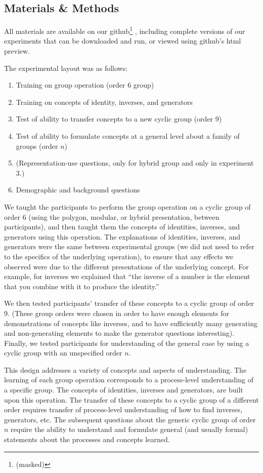 \documentclass[man,10pt]{apa6}
\begin{document}
\subsection{Materials \& Methods} 
All materials are available on our github\footnote{(masked)}%
, including complete versions of our experiments that can be downloaded and run, or viewed using github's html preview. \par
The experimental layout was as follows:
\begin{enumerate}
\item Training on group operation (order 6 group)
\item Training on concepts of identity, inverses, and generators
\item Test of ability to transfer concepts to a new cyclic group (order 9)
\item Test of ability to formulate concepts at a general level about a family of groups (order $n$)
\item (Representation-use questions, only for hybrid group and only in experiment 3.)
\item Demographic and background questions
\end{enumerate}
We taught the participants to perform the group operation on a cyclic group of order 6 (using the polygon, modular, or hybrid presentation, between participants), and then taught them the concepts of identities, inverses, and generators using this operation. The explanations of identities, inverses, and generators were the same between experimental groups (we did not need to refer to the specifics of the underlying operation), to ensure that any effects we observed were due to the different presentations of the underlying concept. For example, for inverses we explained that ``the inverse of a number is the element that you combine with it to produce the identity.''\par
We then tested participants' transfer of these concepts to a cyclic group of order 9. (These group orders were chosen in order to have enough elements for demonstrations of concepts like inverses, and to have sufficiently many generating and non-generating elements to make the generator questions interesting). Finally, we tested participants for understanding of the general case by using a cyclic group with an unspecified order $n$. \par
This design addresses a variety of concepts and aspects of understanding. The learning of each group operation corresponds to a process-level understanding of a specific group. The concepts of identities, inverses and generators, are built upon this operation. The transfer of these concepts to a cyclic group of a different order requires transfer of process-level understanding of how to find inverses, generators, etc. The subsequent questions about the generic cyclic group of order $n$ require the ability to understand and formulate general (and usually formal) statements about the processes and concepts learned. 
\end{document}
